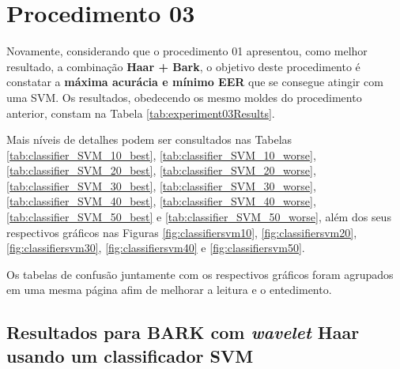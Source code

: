 	\section{Procedimento 03}
		\label{chap:testsResults:sec:Experimento03}
		\par Novamente, considerando que o procedimento 01 apresentou, como melhor resultado, a combinação \textbf{Haar + Bark}, o objetivo deste procedimento é constatar a \textbf{máxima acurácia e mínimo EER} que se consegue atingir com uma SVM. Os resultados, obedecendo os mesmo moldes do procedimento anterior, constam na Tabela \ref{tab:experiment03Results}.\\
		
		\par Mais níveis de detalhes podem ser consultados nas Tabelas \ref{tab:classifier_SVM_10_best}, \ref{tab:classifier_SVM_10_worse}, \ref{tab:classifier_SVM_20_best}, \ref{tab:classifier_SVM_20_worse}, \ref{tab:classifier_SVM_30_best}, \ref{tab:classifier_SVM_30_worse}, \ref{tab:classifier_SVM_40_best}, \ref{tab:classifier_SVM_40_worse}, \ref{tab:classifier_SVM_50_best} e \ref{tab:classifier_SVM_50_worse}, além dos seus respectivos gráficos nas Figuras \ref{fig:classifiersvm10}, \ref{fig:classifiersvm20}, \ref{fig:classifiersvm30}, \ref{fig:classifiersvm40} e \ref{fig:classifiersvm50}.

		
		
		\par Os tabelas de confusão juntamente com os respectivos gráficos foram agrupados em uma mesma página afim de melhorar a leitura e o entedimento.

		\subsection{Resultados para BARK com \textit{wavelet} Haar usando um classificador SVM}
			
			
			
			
			

